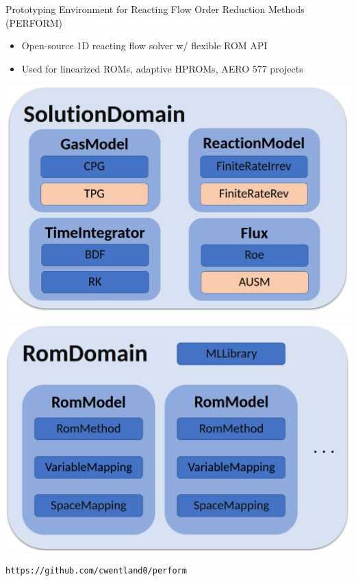 \documentclass[]{beamer}
\begin{document}
\begin{frame}{\footnotesize{Prototyping Environment for Reacting Flow Order Reduction Methods (PERFORM)\footnotemark[10]}}
	\begin{itemize}
		\small
		\item Open-source 1D reacting flow solver w/ flexible ROM API
		\item Used for linearized ROMs\footnotemark[0], adaptive HPROMs\footnotemark[0], AERO 577 projects
		\normalsize
	\end{itemize}
	\vspace{0.5em}
	\begin{minipage}{0.49\linewidth}
		\includegraphics[width=0.99\linewidth]{Images/experiments/transientFlame/performFOMAPI.png}
	\end{minipage}
	\begin{minipage}{0.49\linewidth}
		\includegraphics[width=0.99\linewidth]{Images/experiments/transientFlame/performROMAPI.png}
	\end{minipage}

	\vspace{1em}
	\centering
	\texttt{https://github.com/cwentland0/perform}
\end{frame}
\end{document}
